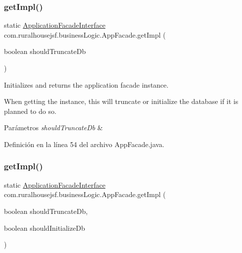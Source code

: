 \subsubsection{\texorpdfstring{getImpl()}{getImpl()}\hspace{0.1cm}{\footnotesize\ttfamily [2/3]}}
{\footnotesize\ttfamily static \mbox{\hyperlink{interfacecom_1_1ruralhousejsf_1_1business_logic_1_1_application_facade_interface}{Application\+Facade\+Interface}} com.\+ruralhousejsf.\+business\+Logic.\+App\+Facade.\+get\+Impl (\begin{DoxyParamCaption}\item[{boolean}]{should\+Truncate\+Db }\end{DoxyParamCaption})\hspace{0.3cm}{\ttfamily [static]}}



Initializes and returns the application facade instance. 

When getting the instance, this will truncate or initialize the database if it is planned to do so.


\begin{DoxyParams}{Parámetros}
{\em should\+Truncate\+Db} & \\
\hline
\end{DoxyParams}


Definición en la línea 54 del archivo App\+Facade.\+java.

\mbox{\label{classcom_1_1ruralhousejsf_1_1business_logic_1_1_app_facade_aab339d9b44293704c9214aef70c7c704}} 
\subsubsection{\texorpdfstring{getImpl()}{getImpl()}\hspace{0.1cm}{\footnotesize\ttfamily [3/3]}}
{\footnotesize\ttfamily static \mbox{\hyperlink{interfacecom_1_1ruralhousejsf_1_1business_logic_1_1_application_facade_interface}{Application\+Facade\+Interface}} com.\+ruralhousejsf.\+business\+Logic.\+App\+Facade.\+get\+Impl (\begin{DoxyParamCaption}\item[{boolean}]{should\+Truncate\+Db,  }\item[{boolean}]{should\+Initialize\+Db }\end{DoxyParamCaption})\hspace{0.3cm}{\ttfamily [static]}}



